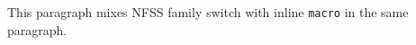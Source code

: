 This paragraph mixes NFSS family switch \ttfamily with inline \texttt{macro} in the same paragraph.

